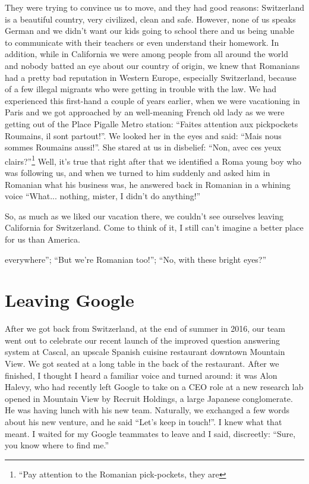 \documentclass[12pt]{book}
\begin{document}
They were trying to convince us to move, and they had good reasons:
Switzerland is a beautiful country, very civilized, clean and safe.
However, none of us speaks German and we didn't want our kids going to
school there and us being unable to communicate with their teachers or
even understand their homework. In addition, while in California we were
among people from all around the world and nobody batted an eye about
our country of origin, we knew that Romanians had a pretty bad
reputation in Western Europe, especially Switzerland, because of a few
illegal migrants who were getting in trouble with the law. We had
experienced this first-hand a couple of years earlier, when we were
vacationing in Paris and we got approached by an well-meaning French old
lady as we were getting out of the Place Pigalle Metro station: ``Faites
attention aux pickpockets Roumains, il sont partout!''. We looked her in
the eyes and said: ``Mais nous sommes Roumains aussi!''. She stared at
us in disbelief: ``Non, avec ces yeux
clairs?''\footnote{
  ``Pay attention to the Romanian pick-pockets, they are} Well, it's
true that right after that we identified a Roma young boy who was
following us, and when we turned to him suddenly and asked him in
Romanian what his business was, he answered back in Romanian in a
whining voice ``What... nothing, mister, I didn't do anything!''

So, as much as we liked our vacation there, we couldn't see ourselves
leaving California for Switzerland. Come to think of it, I still can't
imagine a better place for us than America.

everywhere''; ``But we're Romanian too!''; ``No, with these bright
eyes?''


\section{Leaving Google}

After we got back from Switzerland, at the end of summer in 2016, our
team went out to celebrate our recent launch of the improved question
answering system at Cascal, an upscale Spanish cuisine restaurant
downtown Mountain View. We got seated at a long table in the back of the
restaurant. After we finished, I thought I heard a familiar voice and
turned around: it was Alon Halevy, who had recently left Google to take
on a CEO role at a new research lab opened in Mountain View by Recruit
Holdings, a large Japanese conglomerate. He was having lunch with his
new team. Naturally, we exchanged a few words about his new venture, and
he said ``Let's keep in touch!''. I knew what that meant. I waited for
my Google teammates to leave and I said, discreetly: ``Sure, you know
where to find me.''
\end{document}
